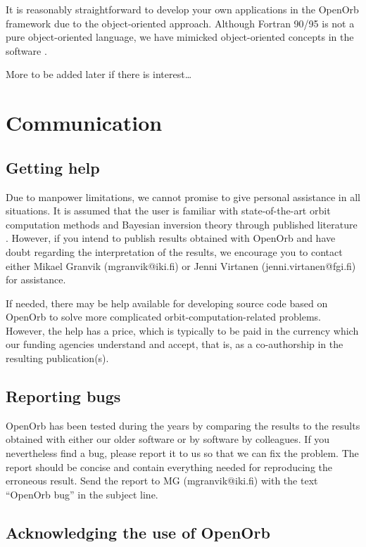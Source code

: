 \documentclass[12pt,english,twoside,a4paper]{report}
\begin{document}
It is reasonably straightforward to develop your own applications in
the OpenOrb framework due to the object-oriented approach. Although
Fortran 90/95 is not a pure object-oriented language, we have mimicked
object-oriented concepts in the software \cite{dec1997a}.

More to be added later if there is interest\ldots


\chapter{Communication}

\section{Getting help}

Due to manpower limitations, we cannot promise to give personal
assistance in all situations. It is assumed that the user is familiar
with state-of-the-art orbit computation methods and Bayesian inversion
theory through published literature
\cite[for reviews, see]{vir2005c,bow2003a,vir2008a}. However,
if you intend to publish results obtained with OpenOrb and have doubt
regarding the interpretation of the results, we encourage you to
contact either Mikael Granvik (mgranvik@iki.fi) or Jenni Virtanen
(jenni.virtanen@fgi.fi) for assistance.

If needed, there may be help available for developing source code
based on OpenOrb to solve more complicated orbit-computation-related
problems. However, the help has a price, which is typically to be paid
in the currency which our funding agencies understand and accept, that
is, as a co-authorship in the resulting publication(s).

\section{Reporting bugs}

OpenOrb has been tested during the years by comparing the results to
the results obtained with either our older software or by software by
colleagues. If you nevertheless find a bug, please report it to us so
that we can fix the problem. The report should be concise and contain
everything needed for reproducing the erroneous result. Send the
report to MG (mgranvik@iki.fi) with the text ``OpenOrb bug'' in the
subject line.

\section{Acknowledging the use of OpenOrb}
\end{document}
